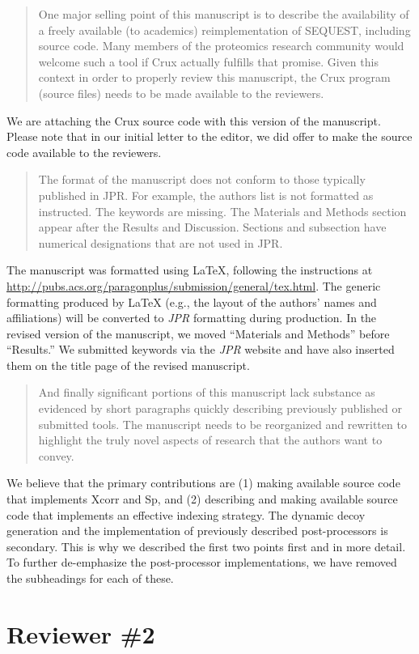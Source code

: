 \documentclass{article}
\newcommand{\breview}{\begin{quotation}\begin{em}\noindent}
\newcommand{\ereview}{\end{em}\end{quotation}}
\begin{document}
\breview One major selling point of this manuscript is to describe the
availability of a freely available (to academics) reimplementation of
SEQUEST, including source code.  Many members of the proteomics
research community would welcome such a tool if Crux actually fulfills
that promise.  Given this context in order to properly review this
manuscript, the Crux program (source files) needs to be made available
to the reviewers. \ereview

We are attaching the Crux source code with this version of the
manuscript.  Please note that in our initial letter to the editor, we
did offer to make the source code available to the reviewers.

\breview The format of the manuscript does not conform to those
typically published in JPR.  For example, the authors list is not
formatted as instructed.  The keywords are missing.  The Materials and
Methods section appear after the Results and Discussion.  Sections and
subsection have numerical designations that are not used in
JPR. \ereview

The manuscript was formatted using LaTeX, following the instructions
at \url{http://pubs.acs.org/paragonplus/submission/general/tex.html}.
The generic formatting produced by LaTeX (e.g., the layout of the
authors' names and affiliations) will be converted to {\em JPR}
formatting during production.  In the revised version of the
manuscript, we moved ``Materials and Methods'' before ``Results.''  We
submitted keywords via the {\em JPR} website and have also inserted
them on the title page of the revised manuscript.

\breview And finally significant portions of this manuscript lack
substance as evidenced by short paragraphs quickly describing
previously published or submitted tools.  The manuscript needs to be
reorganized and rewritten to highlight the truly novel aspects of
research that the authors want to convey. \ereview

We believe that the primary contributions are (1) making available
source code that implements Xcorr and Sp, and (2) describing and
making available source code that implements an effective indexing
strategy.  The dynamic decoy generation and the implementation of
previously described post-processors is secondary.  This is why we
described the first two points first and in more detail.  To further
de-emphasize the post-processor implementations, we have removed the
subheadings for each of these.

\section*{Reviewer \#2}
\end{document}
